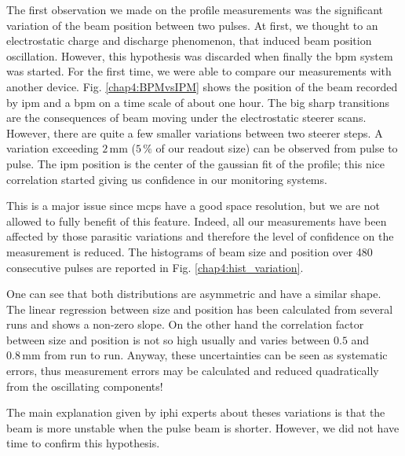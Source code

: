 \begin{refsection}
  The first observation we made on the profile measurements was the significant variation of the beam position between two pulses. At first, we thought to an electrostatic charge and discharge phenomenon, that induced beam position oscillation. However, this hypothesis was discarded when finally the \acrshort{bpm} system was started. For the first time, we were able to compare our measurements with another device. Fig. \ref{chap4:BPMvsIPM} shows the position of the beam recorded by \acrshort{ipm} and a \acrshort{bpm} on a time scale of about one hour. The big sharp transitions are the consequences of beam moving under the electrostatic steerer scans. However, there are quite a few smaller variations between two steerer steps. A variation exceeding $2\,\mathrm{mm}$ ($5\,\mathrm{\%}$ of our readout size) can be observed from pulse to pulse. The \acrshort{ipm} position is the center of the gaussian fit of the profile; this nice correlation started giving us confidence in our monitoring systems.

  

  This is a major issue since \acrshort{mcp}s have a good space resolution, but we are not allowed to fully benefit of this feature. Indeed, all our measurements have been affected by those parasitic variations and therefore the level of confidence on the measurement is reduced. The histograms of beam size and position over 480 consecutive pulses are reported in Fig. \ref{chap4:hist_variation}. 
  

  One can see that both distributions are asymmetric and have a similar shape. The linear regression between size and position has been calculated from several runs and shows a non-zero slope. On the other hand the correlation factor between size and position is not so high usually and varies between $0.5$ and $0.8\,\mathrm{mm}$ from run to run.
  Anyway, these uncertainties can be seen as systematic errors, thus measurement errors may be calculated and reduced quadratically from the oscillating components!

  The main explanation given by \acrshort{iphi} experts about theses variations is that the beam is more unstable when the pulse beam is shorter. However, we did not have time to confirm this hypothesis.


\end{refsection}
